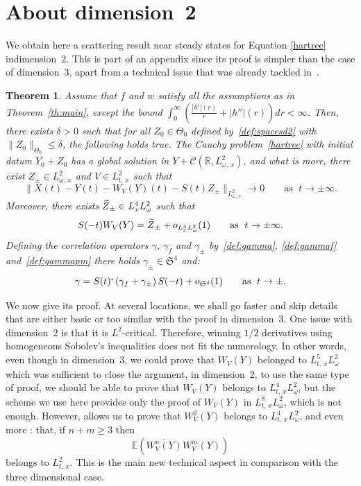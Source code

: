 \documentclass[10pt]{amsart}
\newtheorem{theo}{Theorem}[section]
\theoremstyle{definition}\newtheorem{defi}[theo]{Definition}\newtheorem{rema}[theo]{Remark}\newtheorem{exam}[theo]{Example}\newtheorem{exem}[theo]{Example}\newtheorem{nota}[theo]{Notation}
\newcommand{\R}{\mathbb{R}}
\newcommand{\E}{\mathbb{E}}
\newcommand{\mclC}{\mathcal{C}}
\newcommand{\frkS}{\mathfrak{S}}
\let\oldtilde\tilde
\renewcommand*{\tilde}[1]{\mathchoice{\widetilde{#1}}{\widetilde{#1}}{\oldtilde{#1}}{\oldtilde{#1}}}
\begin{document}
\appendix

\section{About dimension~2}\label{sec:dim2}


We obtain here a scattering result near steady states for Equation \eqref{hartree} in\linebreak dimension~2. This is part of an appendix since its proof is simpler than the case of dimension~3, apart from a technical issue that was already tackled in~\cite{FLLS,lewsab2}.

\begin{theo}\label{th:dim2}
Assume that $f$ and $w$ satisfy all the assumptions as in Theorem~\ref{th:main}, except the bound $\int_0^\infty (\tfrac{|h'|(r)}{r}+|h''|(r))dr<\infty$. Then, there exists $\delta >0$ such that for all $Z_0 \in \Theta_0$ defined by~\eqref{def:spacesd2} with $\| Z_0 \|_{\Theta_0}\leq \delta$, the following holds true. The Cauchy problem~\eqref{hartree} with initial datum $Y_0+Z_0$ has a global solution in $Y + \mclC (\R, L^2_{\omega,\,x})$, and what is more, there exist $Z_\pm \in L^2_{\omega,\,x}$ and $V\in L^{2}_{t,\,x}$ such that
\begin{equation} \label{id:scatteringd=2}
\big\|X(t) - Y(t) - W_V(Y)(t)-S(t) Z_\pm\big\|_{L^2_{\omega,\,x}} \rightarrow 0 \quad \quad \text{as }\; t\rightarrow \pm \infty.
\end{equation}
Moreover, there exists $\tilde Z_\pm \in L^4_x L^2_\omega$ such that
\[
S(-t)W_V(Y) = \tilde Z_\pm + o_{L^4_x L^2_\omega} (1) \quad \quad \text{as }\; t\rightarrow \pm \infty.
\]
Defining the correlation operators $\gamma$, $\gamma_f$ and $\gamma_\pm$ by~\eqref{def:gamma}, \eqref{def:gammaf} and~\eqref{def:gammapm} there holds $\gamma_\pm \in \frkS^{4}$ and:
\begin{equation} \label{id:scatteringdensityd=2}
\gamma=S(t)`\left(\gamma_f+\gamma_\pm\right)S(-t)+o_{\frkS^4}(1) \quad \quad \text{as }\; t\rightarrow \pm.
\end{equation}
\end{theo}


We now give its proof. At several locations, we shall go faster and skip details that are either basic or too similar with the proof in dimension~3. One issue with dimension~2 is that it is $L^2$-critical. Therefore, winning $1/2$ derivatives using homogeneous Sobolev's inequalities does not fit the numerology. In other words, even though in dimension~3, we could prove that $W_V(Y)$ belonged to $L^5_{t,\,x} L^2_\omega$ which was sufficient to close the argument, in dimension~2, to use the same type of proof, we should be able to prove that $W_V(Y)$ belongs to $L^4_{t,\,x} L^2_\omega$, but the scheme we use here provides only the proof of $W_V(Y)$ in $L^8_{t,\,x} L^2_\omega$, which is not enough. However, \cite[Lemma~3 in Section~4]{lewsab2} allows us to prove that $W_V^2(Y)$ belongs to $L^4_{t,\,x} L^2_\omega$, and even more : that, if $n+m \geq 3$ then
\[
\E\left(\overline{W_V^n(Y)} W_V^m(Y)\right)
\]
belongs to $L^2_{t,\,x}$. This is the main new technical aspect in comparison with the three dimensional case.
\end{document}
